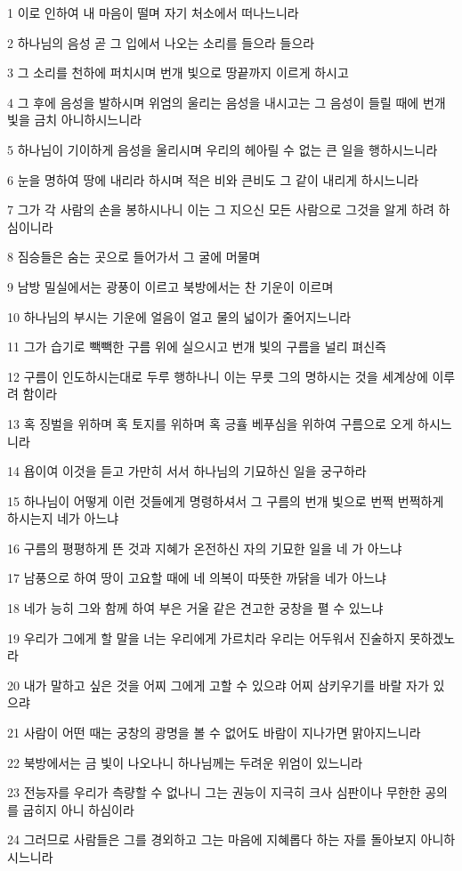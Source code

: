 \par 1 이로 인하여 내 마음이 떨며 자기 처소에서 떠나느니라
\par 2 하나님의 음성 곧 그 입에서 나오는 소리를 들으라 들으라
\par 3 그 소리를 천하에 퍼치시며 번개 빛으로 땅끝까지 이르게 하시고
\par 4 그 후에 음성을 발하시며 위엄의 울리는 음성을 내시고는 그 음성이 들릴 때에 번개 빛을 금치 아니하시느니라
\par 5 하나님이 기이하게 음성을 울리시며 우리의 헤아릴 수 없는 큰 일을 행하시느니라
\par 6 눈을 명하여 땅에 내리라 하시며 적은 비와 큰비도 그 같이 내리게 하시느니라
\par 7 그가 각 사람의 손을 봉하시나니 이는 그 지으신 모든 사람으로 그것을 알게 하려 하심이니라
\par 8 짐승들은 숨는 곳으로 들어가서 그 굴에 머물며
\par 9 남방 밀실에서는 광풍이 이르고 북방에서는 찬 기운이 이르며
\par 10 하나님의 부시는 기운에 얼음이 얼고 물의 넓이가 줄어지느니라
\par 11 그가 습기로 빽빽한 구름 위에 실으시고 번개 빛의 구름을 널리 펴신즉
\par 12 구름이 인도하시는대로 두루 행하나니 이는 무릇 그의 명하시는 것을 세계상에 이루려 함이라
\par 13 혹 징벌을 위하며 혹 토지를 위하며 혹 긍휼 베푸심을 위하여 구름으로 오게 하시느니라
\par 14 욥이여 이것을 듣고 가만히 서서 하나님의 기묘하신 일을 궁구하라
\par 15 하나님이 어떻게 이런 것들에게 명령하셔서 그 구름의 번개 빛으로 번쩍 번쩍하게 하시는지 네가 아느냐
\par 16 구름의 평평하게 뜬 것과 지혜가 온전하신 자의 기묘한 일을 네 가 아느냐
\par 17 남풍으로 하여 땅이 고요할 때에 네 의복이 따뜻한 까닭을 네가 아느냐
\par 18 네가 능히 그와 함께 하여 부은 거울 같은 견고한 궁창을 펼 수 있느냐
\par 19 우리가 그에게 할 말을 너는 우리에게 가르치라 우리는 어두워서 진술하지 못하겠노라
\par 20 내가 말하고 싶은 것을 어찌 그에게 고할 수 있으랴 어찌 삼키우기를 바랄 자가 있으랴
\par 21 사람이 어떤 때는 궁창의 광명을 볼 수 없어도 바람이 지나가면 맑아지느니라
\par 22 북방에서는 금 빛이 나오나니 하나님께는 두려운 위엄이 있느니라
\par 23 전능자를 우리가 측량할 수 없나니 그는 권능이 지극히 크사 심판이나 무한한 공의를 굽히지 아니 하심이라
\par 24 그러므로 사람들은 그를 경외하고 그는 마음에 지혜롭다 하는 자를 돌아보지 아니하시느니라

